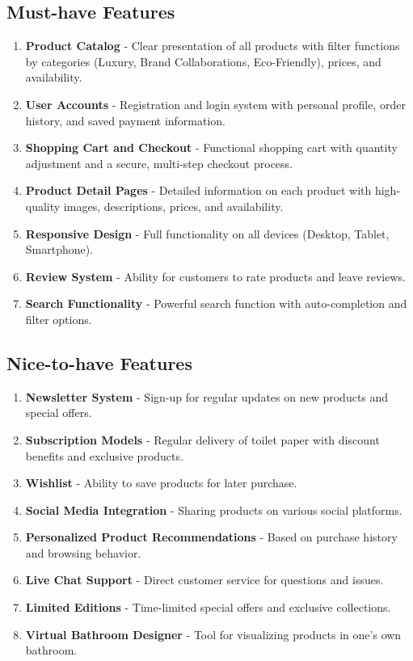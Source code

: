 \documentclass[a4paper,11pt]{article}
\begin{document}
\subsection{Must-have Features}
\begin{enumerate}[label=\textbf{MF\arabic*:}]
    \item \textbf{Product Catalog} - Clear presentation of all products with filter functions by categories (Luxury, Brand Collaborations, Eco-Friendly), prices, and availability.
    \item \textbf{User Accounts} - Registration and login system with personal profile, order history, and saved payment information.
    \item \textbf{Shopping Cart and Checkout} - Functional shopping cart with quantity adjustment and a secure, multi-step checkout process.
    \item \textbf{Product Detail Pages} - Detailed information on each product with high-quality images, descriptions, prices, and availability.
    \item \textbf{Responsive Design} - Full functionality on all devices (Desktop, Tablet, Smartphone).
    \item \textbf{Review System} - Ability for customers to rate products and leave reviews.
    \item \textbf{Search Functionality} - Powerful search function with auto-completion and filter options.
\end{enumerate}

\subsection{Nice-to-have Features}
\begin{enumerate}[label=\textbf{NF\arabic*:}]
    \item \textbf{Newsletter System} - Sign-up for regular updates on new products and special offers.
    \item \textbf{Subscription Models} - Regular delivery of toilet paper with discount benefits and exclusive products.
    \item \textbf{Wishlist} - Ability to save products for later purchase.
    \item \textbf{Social Media Integration} - Sharing products on various social platforms.
    \item \textbf{Personalized Product Recommendations} - Based on purchase history and browsing behavior.
    \item \textbf{Live Chat Support} - Direct customer service for questions and issues.
    \item \textbf{Limited Editions} - Time-limited special offers and exclusive collections.
    \item \textbf{Virtual Bathroom Designer} - Tool for visualizing products in one's own bathroom.
\end{enumerate}
\end{document}
